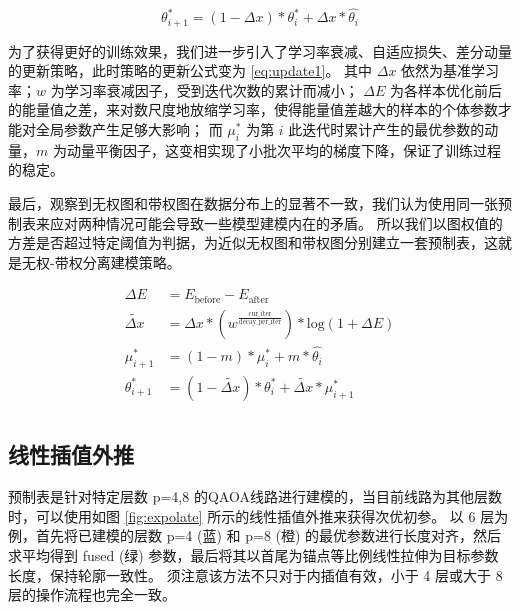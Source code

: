 \documentclass[withoutpreface,bwprint]{cumcmthesis}
\begin{document}
\begin{equation}
\theta_{i+1}^\ast = (1 - \Delta x) * \theta_i^\ast + \Delta x * \hat{\theta_i}
\label{eq:update0}
\end{equation}

为了获得更好的训练效果，我们进一步引入了学习率衰减、自适应损失、差分动量的更新策略，此时策略的更新公式变为 \ref{eq:update1}。
其中 $ \Delta x $ 依然为基准学习率；$ w $ 为学习率衰减因子，受到迭代次数的累计而减小；
$ \Delta E $ 为各样本优化前后的能量值之差，来对数尺度地放缩学习率，使得能量值差越大的样本的个体参数才能对全局参数产生足够大影响；
而 $ \mu_i^\ast $ 为第 $ i $ 此迭代时累计产生的最优参数的动量，$ m $ 为动量平衡因子，这变相实现了小批次平均的梯度下降，保证了训练过程的稳定。

最后，观察到无权图和带权图在数据分布上的显著不一致，我们认为使用同一张预制表来应对两种情况可能会导致一些模型建模内在的矛盾。
所以我们以图权值的方差是否超过特定阈值为判据，为近似无权图和带权图分别建立一套预制表，这就是无权-带权分离建模策略。

\begin{equation}
\begin{split}
\Delta E &= E_{\mathrm{before}} - E_{\mathrm{after}} \\
\tilde{\Delta x} &= \Delta x * (w^{\frac{\mathrm{cur\_iter}}{\mathrm{decay\_per\_iter}}}) * \mathrm{log}(1 + \Delta E) \\
\mu_{i+1}^\ast &= (1 - m) * \mu_i^\ast + m * \hat{\theta_i} \\
\theta_{i+1}^\ast &= (1 - \tilde{\Delta x}) * \theta_i^\ast + \tilde{\Delta x} * \mu_{i+1}^\ast \\
\end{split}
\label{eq:update1}
\end{equation}

\subsection{线性插值外推}

预制表是针对特定层数 p=4,8 的QAOA线路进行建模的，当目前线路为其他层数时，可以使用如图 \ref{fig:expolate} 所示的线性插值外推来获得次优初参。
以 6 层为例，首先将已建模的层数 p=4 (蓝) 和 p=8 (橙) 的最优参数进行长度对齐，然后求平均得到 fused (绿) 参数，最后将其以首尾为锚点等比例线性拉伸为目标参数长度，保持轮廓一致性。
须注意该方法不只对于内插值有效，小于 4 层或大于 8 层的操作流程也完全一致。
\end{document}
